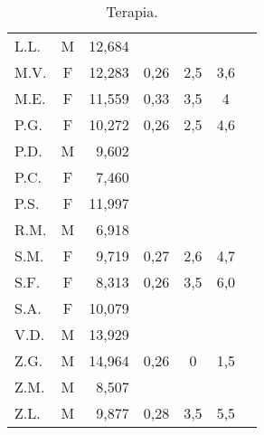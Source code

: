 \begin{table}[!h]
\begin{center}
\begin{tabular}{lcrcccl}
L.L.	& M & 12,684  	      &             &                  &     \\
M.V.	& F & 12,283  	      &  0,26       & 2,5              & 3,6 \\
M.E.	& F & 11,559  	      &  0,33       & 3,5              & 4   \\
P.G.	& F & 10,272  	      &  0,26       & 2,5              & 4,6 \\
P.D.	& M & 9,602   	      &             &                  &     \\
P.C.	& F & 7,460   	      &             &                  &     \\
P.S.	& F & 11,997  	      &             &                  &     \\
R.M.	& M & 6,918   	      &             &                  &     \\
S.M.	& F & 9,719   	      &  0,27       & 2,6              & 4,7 \\
S.F.	& F & 8,313   	      &  0,26       & 3,5              & 6,0 \\
S.A.	& F & 10,079  	      &             &                  &     \\
V.D.	& M & 13,929  	      &             &                  &     \\
Z.G.	& M & 14,964  	      &  0,26       & 0                & 1,5 \\
Z.M.	& M & 8,507   	      &             &                  &     \\
Z.L.	& M & 9,877   	      &  0,28       & 3,5              & 5,5 \\
\bottomrule
\end{tabular}
\end{center}
\caption{Terapia.}
\label{tab:Terapia}
\end{table}


